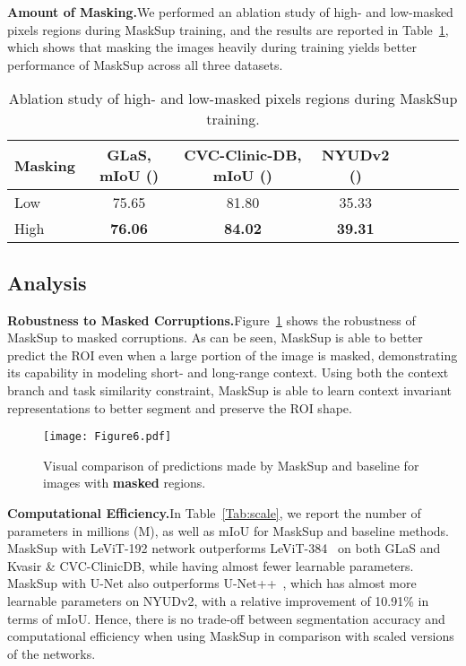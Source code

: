\documentclass{bmvc2k}
\begin{document}
\medskip\noindent\textbf{Amount of Masking.}\quad We performed an ablation study of high- and low-masked pixels regions during MaskSup training, and the results are reported in Table~\ref{Tab:mask}, which shows that masking the images heavily during training yields better performance of MaskSup across all three datasets.

\begin{table}[!htb]
\caption{Ablation study of high- and low-masked pixels regions during MaskSup training.}
\medskip
\centering
\begin{tabular}{l*{7}{c}}
\toprule
\textbf{Masking} & \textbf{GLaS, mIoU ()} & \textbf{CVC-Clinic-DB, mIoU ()} & \textbf{NYUDv2 ()} \\
\midrule
Low & 75.65 & 81.80 & 35.33 \\
High & \textbf{76.06} & \textbf{84.02} & \textbf{39.31} \\
\bottomrule
\end{tabular}
\label{Tab:mask}
\end{table}

\subsection{Analysis}
\noindent\textbf{Robustness to Masked Corruptions.}\quad Figure~\ref{Fig:qualmask} shows the robustness of MaskSup to masked corruptions. As can be seen, MaskSup is able to better predict the ROI even when a large portion of the image is masked, demonstrating its capability in modeling short- and long-range context. Using both the context branch and task similarity constraint, MaskSup is able to learn context invariant representations to better segment and preserve the ROI shape.

\begin{figure}[!htb]
\centering
\texttt{[image: Figure6.pdf]}
\caption{Visual comparison of predictions made by MaskSup and baseline for images with \textbf{masked} regions.}
\label{Fig:qualmask}
\end{figure}

\medskip\noindent\textbf{Computational Efficiency.}\quad In Table~\ref{Tab:scale}, we report the number of parameters in millions (M), as well as mIoU for MaskSup and baseline methods. MaskSup with LeViT-192 network outperforms LeViT-384~\cite{xu2021levit} on both GLaS and Kvasir \& CVC-ClinicDB, while having almost  fewer learnable parameters. MaskSup with U-Net also outperforms U-Net++~\cite{zhou2019unet++}, which has almost  more learnable parameters on NYUDv2, with a relative improvement of 10.91\% in terms of mIoU. Hence, there is no trade-off between segmentation accuracy and computational efficiency when using MaskSup in comparison with scaled versions of the networks.
\end{document}
